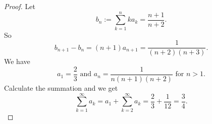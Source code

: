 \begin{Exercise}
\begin{proof}
Let 
$$
b_n 
:= \sum_{k=1}^{n} k a_k 
= \frac{n+1}{n+2}. 
$$
So 
$$
b_{n+1}-b_n
= (n+1)a_{n+1}
= \frac{1}{(n+2)(n+3)}. 
$$
We have 
$$
a_1=\frac{2}{3}\text{ and } a_n=\frac{1}{n(n+1)(n+2)}\mbox{ for }n > 1.
$$
Calculate the summation and we get
$$
\sum_{k=1}^{\infty} a_k 
= a_1+\sum_{k=2}^{\infty} a_k 
= \frac{2}{3}+\frac{1}{12} = \frac{3}{4}.
$$
\end{proof}
\end{Exercise}